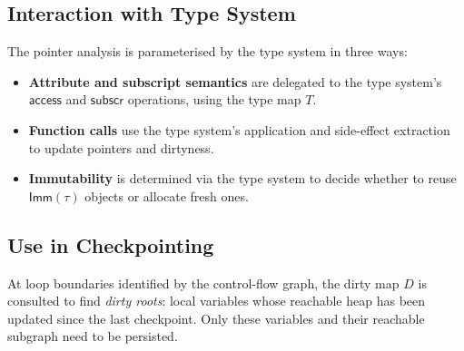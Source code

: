 \subsection{Interaction with Type System}
The pointer analysis is parameterised by the type system in three ways:
\begin{itemize}
\item \textbf{Attribute and subscript semantics} are delegated to the type system's $\mathsf{access}$ and $\mathsf{subscr}$ operations, using the type map $T$.
\item \textbf{Function calls} use the type system's application and side-effect extraction to update pointers and dirtyness.
\item \textbf{Immutability} is determined via the type system to decide whether to reuse $\mathsf{Imm}(\tau)$ objects or allocate fresh ones.
\end{itemize}

\subsection{Use in Checkpointing}
At loop boundaries identified by the control-flow graph, the dirty map $D$ is consulted to find \emph{dirty roots}: local variables whose reachable heap has been updated since the last checkpoint. Only these variables and their reachable subgraph need to be persisted.
